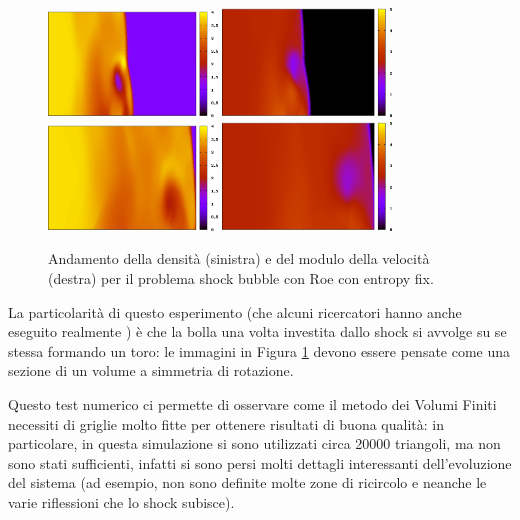 \begin{figure}[htbp]
\includegraphics[width=0.4\textwidth]{images/ShockBubbleNew/height-solution0030bis.png}  \hspace{0.2cm}
\includegraphics[width=0.4\textwidth]{images/ShockBubbleNew/velocity-solution0030bis.png}  \\[0.5cm]
\includegraphics[width=0.4\textwidth]{images/ShockBubbleNew/height-solution0060bis.png}  \hspace{0.2cm}
\includegraphics[width=0.4\textwidth]{images/ShockBubbleNew/velocity-solution0060bis.png}
\caption{Andamento della densità (sinistra) e del modulo della velocità (destra) per il problema shock bubble con Roe con entropy fix.}
\label{fig:shockbubble}
\end{figure}

La particolarità di questo esperimento (che alcuni ricercatori hanno anche eseguito realmente \cite{Williams1998307}) è che la bolla una volta investita dallo shock si avvolge su se stessa formando un toro: le immagini in Figura \ref{fig:shockbubble} devono essere pensate come una sezione di un volume a simmetria di rotazione.

Questo test numerico ci permette di osservare come il metodo dei Volumi Finiti necessiti di griglie molto fitte per ottenere risultati di buona qualità: in particolare, in questa simulazione si sono utilizzati circa 20000 triangoli, ma non sono stati sufficienti, infatti si sono persi molti dettagli interessanti dell'evoluzione del sistema (ad esempio, non sono definite molte zone di ricircolo e neanche le varie riflessioni che lo shock subisce).
